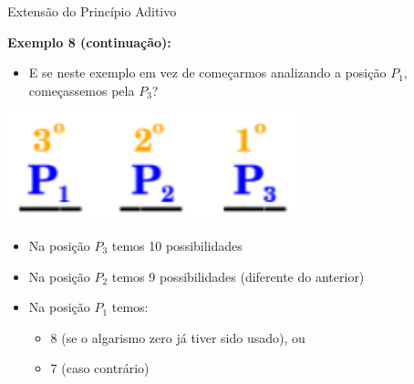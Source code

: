 \documentclass[aspectratio=169]{beamer}
\begin{document}
\begin{frame}{Extensão do Princípio Aditivo}

    \textbf{Exemplo 8 (continuação):}

\begin{itemize}
    \item E se neste exemplo em vez de começarmos analizando a posição $P_1$, começassemos pela $P_3$?
\end{itemize}

\begin{center}
    \includegraphics[width=0.25\linewidth]{figs/3digitos4.png}
\end{center}

\begin{itemize}
    \item Na posição $P_3$ temos 10 possibilidades
    \item Na posição $P_2$ temos 9 possibilidades (diferente do anterior)
    \item Na posição $P_1$ temos:
    \begin{itemize}
        \item 8 (se o algarismo zero já tiver sido usado), ou
        \item 7 (caso contrário)
    \end{itemize} 
\end{itemize}
\vspace{2mm}

\end{frame}
\end{document}
